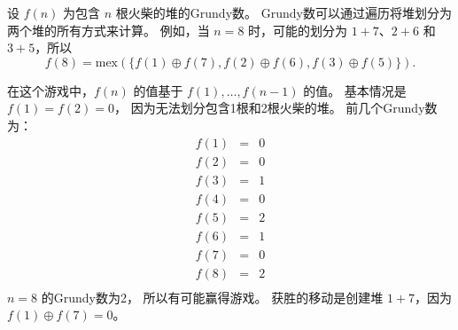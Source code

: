 设 $f(n)$ 为包含 $n$ 根火柴的堆的Grundy数。
Grundy数可以通过遍历将堆划分为
两个堆的所有方式来计算。
例如，当 $n=8$ 时，可能的划分为
$1+7$、$2+6$ 和 $3+5$，所以
\[f(8)=\textrm{mex}(\{f(1) \oplus f(7), f(2) \oplus f(6), f(3) \oplus f(5)\}).\]

在这个游戏中，$f(n)$ 的值基于
$f(1),\ldots,f(n-1)$ 的值。
基本情况是 $f(1)=f(2)=0$，
因为无法划分包含1根和2根火柴的堆。
前几个Grundy数为：
\[
\begin{array}{lcl}
f(1) & = & 0 \\
f(2) & = & 0 \\
f(3) & = & 1 \\
f(4) & = & 0 \\
f(5) & = & 2 \\
f(6) & = & 1 \\
f(7) & = & 0 \\
f(8) & = & 2 \\
\end{array}
\]
$n=8$ 的Grundy数为2，
所以有可能赢得游戏。
获胜的移动是创建堆
$1+7$，因为 $f(1) \oplus f(7) = 0$。

